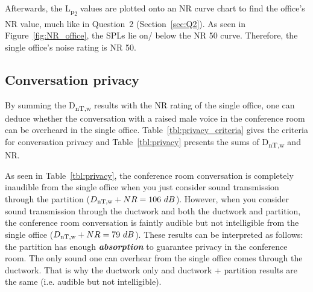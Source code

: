 





Afterwards, the L\textsubscript{p\textsubscript{2}} values are plotted onto an NR curve chart to find the office's NR value, much like in Question~2 (Section~\ref{sec:Q2}).
As seen in Figure~\ref{fig:NR_office}, the SPLs lie on/ below the NR 50 curve.
Therefore, the single office's noise rating is NR 50.





\newpage
\subsection{Conversation privacy} \label{sec:Q4.4}

By summing the D\textsubscript{nT,w} results with the NR rating of the single office, one can deduce whether the conversation with a raised male voice in the conference room can be overheard in the single office.
Table~\ref{tbl:privacy_criteria} gives the criteria for conversation privacy and Table~\ref{tbl:privacy} presents the sums of D\textsubscript{nT,w} and NR.

As seen in Table~\ref{tbl:privacy}, the conference room conversation is completely inaudible from the single office when you just consider sound transmission through the partition ($D\textsubscript{nT,w} + NR = 106~dB$).
However, when you consider sound transmission through the ductwork and both the ductwork and partition, the conference room conversation is faintly audible but not intelligible from the single office ($D\textsubscript{nT,w} + NR = 79~dB$).
These results can be interpreted as follows:
the partition has enough \textbf{\textit{absorption}} to guarantee privacy in the conference room. 
The only sound one can overhear from the single office comes through the ductwork.
That is why the ductwork only and ductwork + partition results are the same (i.e. audible but not intelligible).



